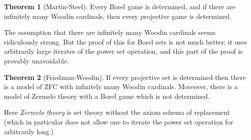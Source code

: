 \documentclass[12pt]{report}
\newcommand{\dfn}[1]{\emph{#1}\index{#1}}
\theoremstyle{definition}
\newtheorem{theorem}{Theorem}[chapter]
\begin{document}
\begin{theorem}[Martin-Steel]
Every Borel game is determined, and if there are infinitely many Woodin cardinals, then every projective game is determined.
\end{theorem}
The assumption that there are infinitely many Woodin cardinals seems ridiculously strong. But the proof of this for Borel sets is not much better: it uses arbitrarily large iterates of the power set operation, and this part of the proof is provably unavoidable.
\begin{theorem}[Friedman-Woodin]
If every projective set is determined then there is a model of ZFC with infinitely many Woodin cardinals. Moreover, there is a model of Zermelo theory with a Borel game which is not determined.
\end{theorem}
Here \dfn{Zermelo theory} is set theory without the axiom schema of replacement (which in particular does not allow one to iterate the power set operation for arbitrarily long.)
\end{document}
